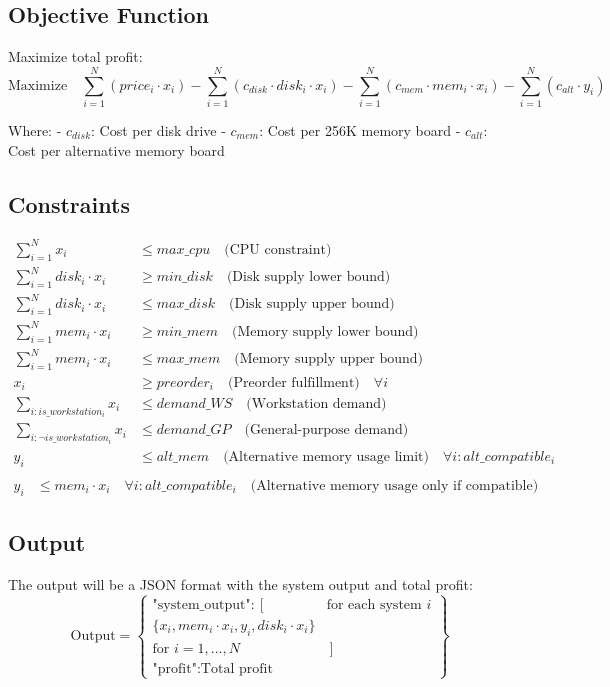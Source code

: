 \documentclass{article}
\begin{document}
\subsection*{Objective Function}
Maximize total profit:
\[
\text{Maximize} \quad \sum_{i=1}^{N} (price_i \cdot x_i) - \sum_{i=1}^{N} (c_{disk} \cdot disk_i \cdot x_i) - \sum_{i=1}^{N} (c_{mem} \cdot mem_i \cdot x_i) - \sum_{i=1}^{N} (c_{alt} \cdot y_i)
\]

Where:
- $c_{disk}$: Cost per disk drive
- $c_{mem}$: Cost per 256K memory board
- $c_{alt}$: Cost per alternative memory board

\subsection*{Constraints}

\begin{align}
\sum_{i=1}^{N} x_i & \leq max\_cpu \quad \text{(CPU constraint)} \\
\sum_{i=1}^{N} disk_i \cdot x_i & \geq min\_disk \quad \text{(Disk supply lower bound)} \\
\sum_{i=1}^{N} disk_i \cdot x_i & \leq max\_disk \quad \text{(Disk supply upper bound)} \\
\sum_{i=1}^{N} mem_i \cdot x_i & \geq min\_mem \quad \text{(Memory supply lower bound)} \\
\sum_{i=1}^{N} mem_i \cdot x_i & \leq max\_mem \quad \text{(Memory supply upper bound)} \\
x_i & \geq preorder_i \quad \text{(Preorder fulfillment)} \quad \forall i \\
\sum_{i: is\_workstation_i} x_i & \leq demand\_WS \quad \text{(Workstation demand)} \\
\sum_{i: \neg is\_workstation_i} x_i & \leq demand\_GP \quad \text{(General-purpose demand)} \\
y_i & \leq alt\_mem \quad \text{(Alternative memory usage limit)} \quad \forall i: alt\_compatible_i \\
\end{align}
\begin{align}
y_i & \leq mem_i \cdot x_i \quad \forall i: alt\_compatible_i \quad \text{(Alternative memory usage only if compatible)}
\end{align}

\subsection*{Output}
The output will be a JSON format with the system output and total profit:
\[
\text{Output} = \left\{ 
\begin{array}{ll}
\text{"system\_output"}: \left[ \right. & \text{for each system } i \\
    \{ x_i, mem_i \cdot x_i, y_i, disk_i \cdot x_i \} & \\
\text{for } i = 1, \ldots, N & \left. \right] \\
\text{"profit"}: \text{Total profit} &
\end{array}
\right\}
\]
\end{document}
